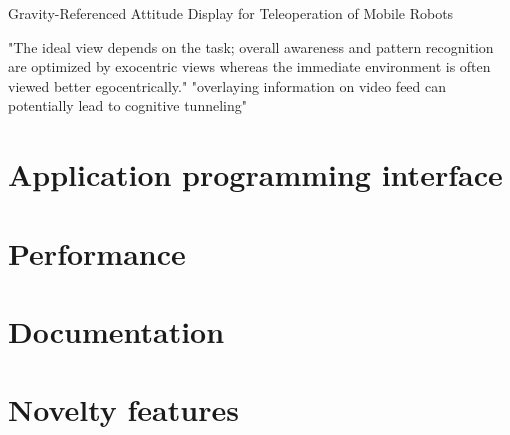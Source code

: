 \citep{Wang2004} Gravity-Referenced Attitude Display for Teleoperation of Mobile Robots

\citep{Chen2007} "The ideal view depends on the task; overall awareness and pattern recognition are optimized by exocentric views whereas the immediate environment is often viewed better egocentrically."
"overlaying information on video feed can potentially lead to cognitive tunneling"


\section{Application programming interface}


\section{Performance}


\section{Documentation}




\section{Novelty features}

